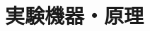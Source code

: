 \documentclass[../../main.tex]{subfiles}
\numberwithin{equation}{section}
\numberwithin{table}{section}
\numberwithin{figure}{section}
\begin{document}
\section{実験機器・原理}
      
\end{document}
